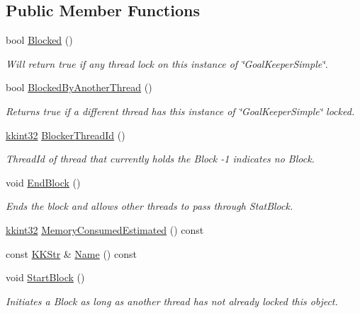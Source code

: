 \subsection*{Public Member Functions}
\begin{DoxyCompactItemize}
\item 
bool \hyperlink{class_k_k_b_1_1_goal_keeper_simple_a51edc4dadfce50698b176d32de92bb6b}{Blocked} ()
\begin{DoxyCompactList}\small\item\em Will return true if any thread lock on this instance of \char`\"{}\+Goal\+Keeper\+Simple\char`\"{}. \end{DoxyCompactList}\item 
bool \hyperlink{class_k_k_b_1_1_goal_keeper_simple_ad6ccd73565c390cfca0a3b7f47be1c92}{Blocked\+By\+Another\+Thread} ()
\begin{DoxyCompactList}\small\item\em Returns true if a different thread has this instance of \char`\"{}\+Goal\+Keeper\+Simple\char`\"{} locked. \end{DoxyCompactList}\item 
\hyperlink{namespace_k_k_b_a8fa4952cc84fda1de4bec1fbdd8d5b1b}{kkint32} \hyperlink{class_k_k_b_1_1_goal_keeper_simple_a01d9c3b3552977dfbdd187112d89dc53}{Blocker\+Thread\+Id} ()
\begin{DoxyCompactList}\small\item\em Thread\+Id of thread that currently holds the Block -\/1 indicates no Block. \end{DoxyCompactList}\item 
void \hyperlink{class_k_k_b_1_1_goal_keeper_simple_a28a529882f7ace4f8300508d4dee9c3e}{End\+Block} ()
\begin{DoxyCompactList}\small\item\em Ends the block and allows other threads to pass through Stat\+Block. \end{DoxyCompactList}\item 
\hyperlink{namespace_k_k_b_a8fa4952cc84fda1de4bec1fbdd8d5b1b}{kkint32} \hyperlink{class_k_k_b_1_1_goal_keeper_simple_a89e05c58c7d851dc6ad858803c37309a}{Memory\+Consumed\+Estimated} () const 
\item 
const \hyperlink{class_k_k_b_1_1_k_k_str}{K\+K\+Str} \& \hyperlink{class_k_k_b_1_1_goal_keeper_simple_a13ef01792887b13a97315780f05fe319}{Name} () const 
\item 
void \hyperlink{class_k_k_b_1_1_goal_keeper_simple_aa8bcf9dcd7f07275aaac8ecdedac8cb1}{Start\+Block} ()
\begin{DoxyCompactList}\small\item\em Initiates a Block as long as another thread has not already locked this object. \end{DoxyCompactList}\end{DoxyCompactItemize}
